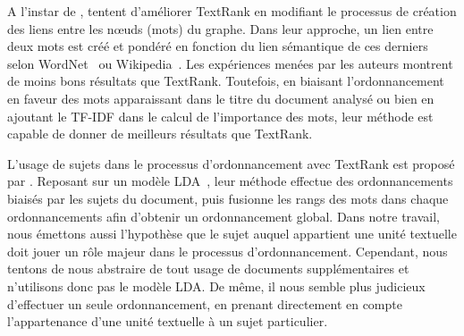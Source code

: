     A l'instar de ,
     tentent d'améliorer TextRank en
    modifiant le processus de création des liens entre les n\oe{}uds (mots) du
    graphe. Dans leur approche, un lien entre deux mots est créé et pondéré en
    fonction du lien sémantique de ces derniers selon
    WordNet~\cite{miller1995wordnet} ou
    Wikipedia~\cite{milne2008wikipediasemanticrelatedness}. Les expériences
    menées par les auteurs montrent de moins bons résultats que TextRank.
    Toutefois, en biaisant l'ordonnancement en faveur des mots apparaissant dans
    le titre du document analysé ou bien en ajoutant le TF-IDF dans le calcul de
    l'importance des mots, leur méthode est capable de donner de meilleurs
    résultats que TextRank.

    L'usage de sujets dans le processus d'ordonnancement avec TextRank est
    proposé par . Reposant sur un modèle
    LDA~\cite[Latent Dirichlet Allocation]{blei2003lda}, leur méthode effectue
    des ordonnancements biaisés par les sujets du document, puis fusionne les
    rangs des mots dans chaque ordonnancements afin d'obtenir un ordonnancement
    global. Dans notre travail, nous émettons aussi l'hypothèse que le sujet
    auquel appartient une unité textuelle doit jouer un rôle majeur dans le
    processus d'ordonnancement. Cependant, nous tentons de nous abstraire de
    tout usage de documents supplémentaires et n'utilisons donc pas le modèle
    LDA. De même, il nous semble plus judicieux d'effectuer un seule
    ordonnancement, en prenant directement en compte l'appartenance d'une unité
    textuelle à un sujet particulier.

